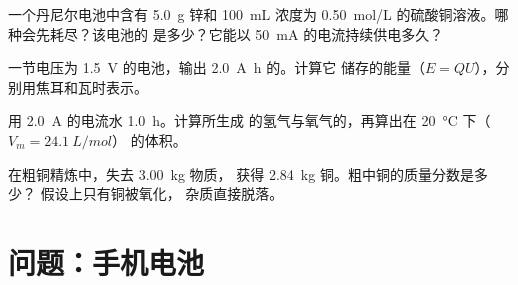\begin{exercise}[$\star\star\star$]\label{exo:g12:cells-and-electrolysis:12}
一个丹尼尔电池中含有 \qty{5.0}{g} 锌和 \qty{100}{mL}
浓度为 \qty{0.50}{mol/L} 的硫酸铜溶液。哪种会先耗尽？该电池的
是多少？它能以 \qty{50}{mA} 的电流持续供电多久？
\end{exercise}

\begin{exercise}[$\star\star\star$]\label{exo:g12:cells-and-electrolysis:13}
一节电压为 \qty{1.5}{V} 的电池，输出 \qty{2.0}{A.h} 的。计算它
储存的能量（$E = Q U$），分别用焦耳和瓦时表示。
\end{exercise}

\begin{exercise}[$\star\star\star$]\label{exo:g12:cells-and-electrolysis:14}
用 \qty{2.0}{A} 的电流水 \qty{1.0}{h}。计算所生成
的氢气与氧气的，再算出在 \qty{20}{\celsius} 下（$V_m = \qty{24.1}{L/mol}$）
的体积。
\end{exercise}

\begin{exercise}[$\star\star\star$]\label{exo:g12:cells-and-electrolysis:15}
在粗铜精炼中，失去 \qty{3.00}{kg} 物质，
获得 \qty{2.84}{kg} 铜。粗中铜的质量分数是多少？
假设上只有铜被氧化，
杂质直接脱落。
\end{exercise}

\section{问题：手机电池}

